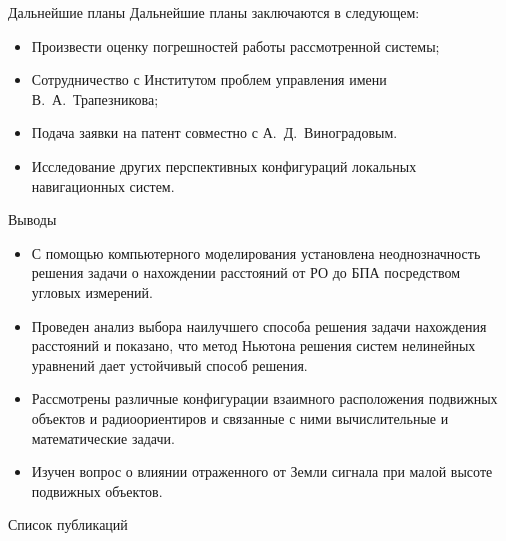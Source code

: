 \documentclass[russian,hyperref={unicode}]{beamer}
\begin{document}
  \begin{frame}{Дальнейшие планы}
    Дальнейшие планы заключаются в следующем:
    \begin{itemize}
      \item Произвести оценку погрешностей работы рассмотренной системы;
      \item Сотрудничество с Институтом проблем управления имени В.~А.~Трапезникова;
      \item Подача заявки на патент совместно с А.~Д.~Виноградовым.
      \item Исследование других перспективных конфигураций локальных навигационных систем.
    \end{itemize}
  \end{frame}

  \begin{frame}{Выводы}
    \begin{itemize}
      \item С помощью компьютерного моделирования установлена неоднозначность решения задачи о нахождении расстояний от РО до БПА посредством угловых измерений.
      \item Проведен анализ выбора наилучшего способа решения задачи нахождения расстояний и показано, что метод Ньютона решения систем нелинейных уравнений дает устойчивый способ решения.
      \item Рассмотрены различные конфигурации взаимного расположения подвижных объектов и радиоориентиров и связанные с ними вычислительные и математические задачи.
      \item Изучен вопрос о влиянии отраженного от Земли сигнала при малой высоте подвижных объектов.
    \end{itemize}
  \end{frame}

  \begin{frame}[allowframebreaks]{Список публикаций}
    \printbibliography
  \end{frame}

  \frame{\titlepage}
\end{document}

